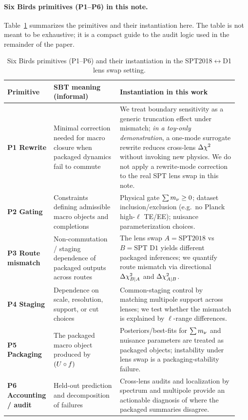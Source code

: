 \paragraph{Six Birds primitives (P1--P6) in this note.}
Table~\ref{tab:sixbirds_primitives} summarizes the primitives and their instantiation here. The table is not meant to be exhaustive; it is a compact guide to the audit logic used in the remainder of the paper.

\begin{table}[t]
  \centering
  \caption{Six Birds primitives (P1--P6) and their instantiation in the SPT2018$\leftrightarrow$D1 lens swap setting.}
  \label{tab:sixbirds_primitives}
  \setlength{\tabcolsep}{4pt}
  \renewcommand{\arraystretch}{1.08}
  \small
  \begin{tabular}{@{}>{\raggedright\arraybackslash}p{0.16\linewidth} >{\raggedright\arraybackslash}p{0.28\linewidth} >{\raggedright\arraybackslash}p{0.50\linewidth}@{}}
    \toprule
    Primitive & SBT meaning (informal) & Instantiation in this work \\
    \midrule
    \textbf{P1 Rewrite} &
    Minimal correction needed for macro closure when packaged dynamics fail to commute &
    We treat boundary sensitivity as a generic truncation effect under mismatch; \emph{in a toy-only demonstration}, a one-mode surrogate rewrite reduces cross-lens $\Delta \chi^2$ without invoking new physics. We do not apply a rewrite-mode correction to the real SPT lens swap in this note. \\
    \textbf{P2 Gating} &
    Constraints defining admissible macro objects and completions &
    Physical gate $\sum m_\nu\ge 0$; dataset inclusion/exclusion (e.g.\ no Planck high-$\ell$ TE/EE); nuisance parameterization choices. \\
    \textbf{P3 Route mismatch} &
    Non-commutation / staging dependence of packaged outputs across routes &
    The lens swap $A=\text{SPT2018}$ vs $B=\text{SPT D1}$ yields different packaged inferences; we quantify route mismatch via directional $\Delta \chi^2_{B|A}$ and $\Delta \chi^2_{A|B}$. \\
    \textbf{P4 Staging} &
    Dependence on scale, resolution, support, or cut choices &
    Common-staging control by matching multipole support across lenses; we test whether the mismatch is explained by $\ell$-range differences. \\
    \textbf{P5 Packaging} &
    The packaged macro object produced by $(U\circ f)$ &
    Posteriors/best-fits for $\sum m_\nu$ and nuisance parameters are treated as packaged objects; instability under lens swap is a packaging-stability failure. \\
    \textbf{P6 Accounting / audit} &
    Held-out prediction and decomposition of failures &
    Cross-lens audits and localization by spectrum and multipole provide an actionable diagnosis of where the packaged summaries disagree. \\
    \bottomrule
  \end{tabular}
\end{table}

